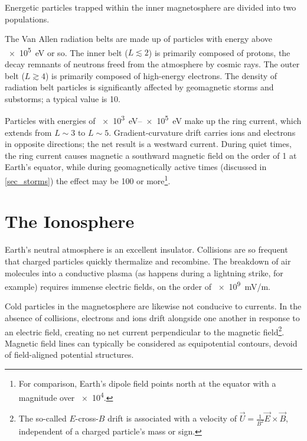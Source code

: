 Energetic particles trapped within the inner magnetosphere are divided into two
populations. 

The Van Allen radiation belts are made up of particles with energy above
\SI{e5}{\eV} or so. The inner belt ($L\lesssim2$) is primarily composed of
protons, the decay remnants of neutrons freed from the atmosphere by cosmic
rays. The outer belt ($L\gtrsim4$) is primarily composed of high-energy
electrons. The density of radiation belt particles is significantly affected by
geomagnetic storms and substorms; a typical value is \SI{10}{\percc}. 

Particles with energies of \SIrange{e3}{e5}{\eV} make up the ring current,
which extends from $L\sim3$ to $L\sim5$. Gradient-curvature drift carries ions
and electrons in opposite directions; the net result is a westward current.
During quiet times, the ring current causes magnetic a southward magnetic field
on the order of \SI{1}{\nT} at Earth's equator, while during geomagnetically
active times (discussed in \cref{sec_storms}) the effect may be \SI{100}{\nT}
or more\footnote{For comparison, Earth's dipole field points north at the
equator with a magnitude over \SI{e4}{\nT}. }. 

\section{The Ionosphere}
  \label{sec_ionos}

Earth's neutral atmosphere is an excellent insulator. Collisions are so
frequent that charged particles quickly thermalize and recombine. The breakdown
of air molecules into a conductive plasma (as happens during a lightning
strike, for example) requires immense electric fields, on the order of
\SI{e9}{\mV/\m}. 

Cold particles in the magnetosphere are likewise not conducive to currents. In
the absence of collisions, electrons and ions drift alongside one another in
response to an electric field, creating no net current perpendicular to the
magnetic field\footnote{The so-called $E$-cross-$B$ drift is associated with a
velocity of $\vec{U} = \frac{1}{B^2} \vec{E} \times \vec{B}$, independent of a
charged particle's mass or sign. }. Magnetic field lines can typically be
considered as equipotential contours, devoid of field-aligned potential
structures. 

